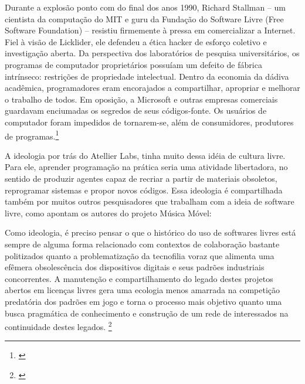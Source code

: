 \begin{citacao}
Durante a explosão ponto com do final dos anos 1990, Richard Stallman – um cientista da computação do MIT e guru da Fundação do Software Livre (Free Software Foundation) – resistiu firmemente à pressa em comercializar a Internet. Fiel à visão de Licklider, ele defendeu a ética hacker de esforço coletivo e investigação aberta. Da perspectiva dos laboratórios de pesquisa universitários, os programas de computador proprietários possuíam um defeito de fábrica intrínseco: restrições de propriedade intelectual. Dentro da economia da dádiva acadêmica, programadores eram encorajados a compartilhar, apropriar e melhorar o trabalho de todos. Em oposição, a Microsoft e outras empresas comerciais guardavam enciumadas os segredos de seus códigos-fonte. Os usuários de computador foram impedidos de tornarem-se, além de consumidores, produtores de programas.\footnote{\cite[367]{Barbrook2009}}
\end{citacao}

A ideologia por trás do Atellier Labs, tinha muito dessa idéia de cultura livre. Para ele, aprender programação na prática seria uma atividade libertadora, no sentido de produzir agentes capaz de recriar a partir de materiais obsoletos, reprogramar sistemas e propor novos códigos. Essa ideologia é compartilhada também por muitos outros pesquisadores que trabalham com a ideia de software livre, como apontam os autores do projeto Música Móvel:

\begin{citacao}
Como ideologia, é preciso pensar o que o histórico do uso de softwares livres está sempre de alguma forma relacionado com contextos de colaboração bastante politizados quanto a problematização da tecnofilia voraz que alimenta uma efêmera obsolescência dos dispositivos digitais e seus padrões industriais concorrentes. A manutenção e compartilhamento do legado destes projetos abertos em licenças livres gera uma ecologia menos amarrada na competição predatória dos padrões em jogo e torna o processo mais objetivo quanto uma busca pragmática de conhecimento e construção de um rede de interessados na continuidade destes legados. \footnote{\cite{Rohde2014}}
\end{citacao}



